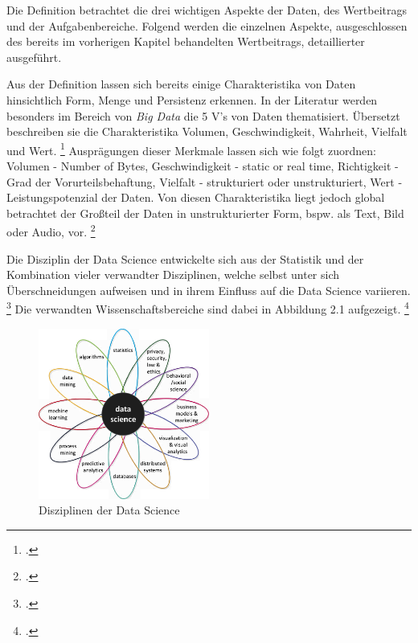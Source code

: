 Die Definition betrachtet die drei wichtigen Aspekte der Daten, des Wertbeitrags und der Aufgabenbereiche.
Folgend werden die einzelnen Aspekte, ausgeschlossen des bereits im vorherigen Kapitel behandelten Wertbeitrags, detaillierter ausgeführt.

Aus der Definition lassen sich bereits einige Charakteristika von Daten hinsichtlich Form, Menge und Persistenz erkennen.
In der Literatur werden besonders im Bereich von \textit{Big Data} die 5 V's von Daten thematisiert.
Übersetzt beschreiben sie die Charakteristika Volumen, Geschwindigkeit, Wahrheit, Vielfalt und Wert. \footcite[Vgl.][S. 1]{Naeem.2022}
Ausprägungen dieser Merkmale lassen sich wie folgt zuordnen: Volumen - Number of Bytes, Geschwindigkeit - static or real time, Richtigkeit - Grad der Vorurteilsbehaftung, Vielfalt - strukturiert oder unstrukturiert, Wert - Leistungspotenzial der Daten.
Von diesen Charakteristika liegt jedoch global betrachtet der Großteil der Daten in unstrukturierter Form, bspw. als Text, Bild oder Audio, vor. \footcite[Vgl.][S. 4]{vanderAalst.2016}

Die Disziplin der Data Science entwickelte sich aus der Statistik und der Kombination vieler verwandter Disziplinen, welche selbst unter sich Überschneidungen aufweisen und in ihrem Einfluss auf die Data Science variieren. \footcite[Vgl.][S. 12]{vanderAalst.2016}
Die verwandten Wissenschaftsbereiche sind dabei in Abbildung 2.1 aufgezeigt. \footcite[Vgl.][S. 12]{vanderAalst.2016}

\begin{figure}[htb]
    \centering
    \includegraphics[width=0.5\textwidth]{graphics/ds_disciplines.png}
    \caption{Disziplinen der Data Science}
    \label{fig:data science disciplines}
\end{figure}

